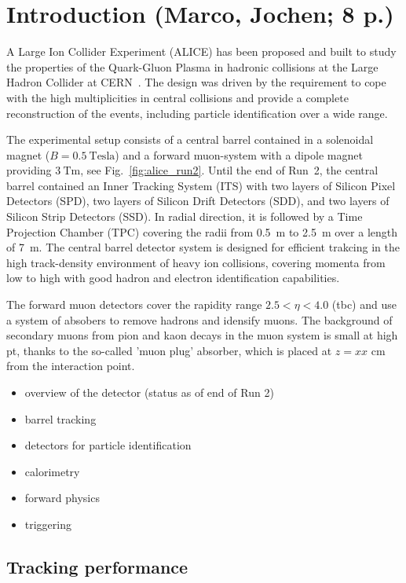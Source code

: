 \section{Introduction (Marco, Jochen; 8 p.)}

A Large Ion Collider Experiment (ALICE) has been proposed and built to study
the properties of the Quark-Gluon Plasma in hadronic collisions at the Large
Hadron Collider at CERN~\cite{Aamodt:2008zz}. The design was driven by the
requirement to cope with the high multiplicities in central \PbPb collisions
and provide a complete reconstruction of the events, including particle
identification over a wide \pt range.

The experimental setup consists of a central barrel contained in a solenoidal
magnet ($B = 0.5~\mathrm{Tesla}$) and a forward muon-system with a dipole magnet
providing $3~\mathrm{Tm}$, see Fig.~\ref{fig:alice_run2}. Until the end of Run~2,
the central barrel contained an Inner Tracking System (ITS) with two layers of
Silicon Pixel Detectors (SPD), two layers of Silicon Drift Detectors (SDD), and
two layers of Silicon Strip Detectors (SSD). In radial direction, it is followed
by a Time Projection Chamber (TPC) covering the radii from 0.5~m to 2.5~m over a
length of 7~m.
The central barrel detector system is designed for efficient trakcing in the high track-density environment of heavy ion collisions, covering momenta from low to high \pt{} with good hadron and electron identification capabilities.

The forward muon detectors cover the rapidity range $2.5 < \eta < 4.0$ (tbc) and use a system of absobers to remove hadrons and idensify muons.
The background of secondary muons from pion and kaon decays in the muon system is small at high pt, thanks to the so-called 'muon plug' absorber, which is placed at $z = xx$ cm from the interaction point.

\begin{itemize}
\item overview of the detector
  (status as of end of Run 2)
\item barrel tracking
\item detectors for particle identification
\item calorimetry
\item forward physics
\item triggering
\end{itemize}

\subsection{Tracking performance}

